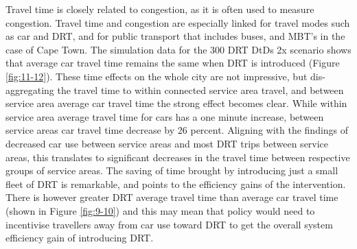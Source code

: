 \documentclass[a4paper]{article}
\begin{document}


Travel time is closely related to congestion, as it is often used to measure congestion. Travel time and congestion are especially linked for travel modes such as car and DRT, and for public transport that includes buses, and MBT's in the case of Cape Town. The simulation data for the 300 DRT DtDs 2x scenario shows that average car travel time remains the same when DRT is introduced (Figure \ref{fig:11-12}). These time effects on the whole city are not impressive, but dis-aggregating the travel time to within connected service area travel, and between service area average car travel time the strong effect becomes clear. While within service area average travel time for cars has a one minute increase, between service areas car travel time decrease by 26 percent. Aligning with the findings of decreased car use between service areas and most DRT trips between service areas, this translates to significant decreases in the travel time between respective groups of service areas. The saving of time brought by introducing just a small fleet of DRT is remarkable, and points to the efficiency gains of the intervention. There is however greater DRT average travel time than average car travel time (shown in Figure \ref{fig:9-10}) and this may mean that policy would need to incentivise travellers away from car use toward DRT to get the overall system efficiency gain of introducing DRT.\\
\end{document}
